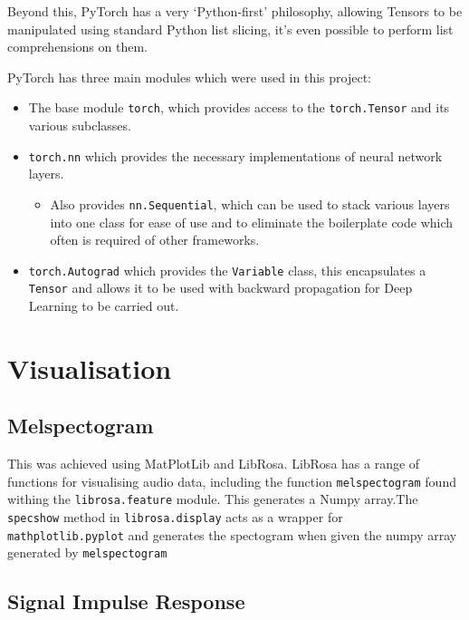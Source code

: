 \documentclass{l4proj}
\providecommand{\tightlist}{%
  \setlength{\itemsep}{0pt}\setlength{\parskip}{0pt}}
\begin{document}
Beyond this, PyTorch has a very `Python-first' philosophy, allowing
Tensors to be manipulated using standard Python list slicing, it's even
possible to perform list comprehensions on them.

PyTorch has three main modules which were used in this project:

\begin{itemize}
\tightlist
\item
  The base module \texttt{torch}, which provides access to the
  \texttt{torch.Tensor} and its various subclasses.
\item
  \texttt{torch.nn} which provides the necessary implementations of
  neural network layers.

  \begin{itemize}
  \tightlist
  \item
    Also provides \texttt{nn.Sequential}, which can be used to stack
    various layers into one class for ease of use and to eliminate the
    boilerplate code which often is required of other frameworks.
  \end{itemize}
\item
  \texttt{torch.Autograd} which provides the \texttt{Variable} class,
  this encapsulates a \texttt{Tensor} and allows it to be used with
  backward propagation for Deep Learning to be carried out.
\end{itemize}

\hypertarget{visualisation}{%
\section{Visualisation}\label{visualisation}}

\hypertarget{melspectogram}{%
\subsection{Melspectogram}\label{melspectogram}}

This was achieved using MatPlotLib and LibRosa. LibRosa has a range of
functions for visualising audio data, including the function
\texttt{melspectogram} found withing the \texttt{librosa.feature}
module. This generates a Numpy array.The \texttt{specshow} method in
\texttt{librosa.display} acts as a wrapper for
\texttt{mathplotlib.pyplot} and generates the spectogram when given the
numpy array generated by \texttt{melspectogram}

\hypertarget{signal-impulse-response}{%
\subsection{Signal Impulse Response}\label{signal-impulse-response}}
\end{document}

